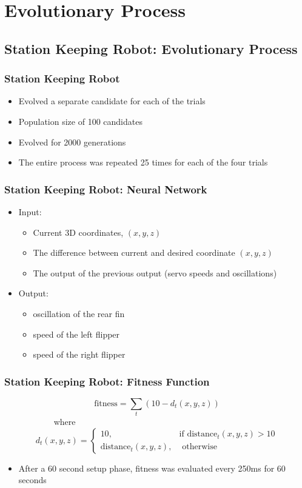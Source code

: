 \documentclass{beamer}
\begin{document}
\section{Evolutionary Process}

\subsection{Station Keeping Robot: Evolutionary Process}
\begin{frame}
  \frametitle{Station Keeping Robot}
\begin{itemize}
\item Evolved a separate candidate for each of the trials
\item Population size of 100 candidates
\item Evolved for 2000 generations
\item The entire process was repeated 25 times for each of the four trials
\end{itemize}
\end{frame}

\begin{frame}
  \frametitle{Station Keeping Robot: Neural Network}
\begin{itemize}
\item Input: 
\begin{itemize}
\item Current 3D coordinates, $(x,y,z)$
\item The difference between current and desired coordinate  $(x,y,z)$
\item The output of the previous output (servo speeds and oscillations)
\end{itemize}
\item Output:
\begin{itemize}
\item oscillation of the rear fin
\item speed of the left flipper
\item speed of the right flipper
\end{itemize}
\end{itemize}
\end{frame}

\begin{frame}
  \frametitle{Station Keeping Robot: Fitness Function}
\begin{equation*}
	\textrm{fitness} = \sum_{t} (10 - d_t(x, y, z))
\end{equation*}
~~~~~~~~~~~  where
\[
	d_t(x, y, z) = 
		\begin{cases} 10, & \textrm{if distance}_t(x, y, z) > 10 \\
					  \textrm{distance}_t(x, y, z), & \textrm{ otherwise}
		\end{cases}
\]
\begin{itemize}
\item After a 60 second setup phase, fitness was evaluated every 250ms for 60 seconds
\end{itemize}
\end{frame}
\end{document}

